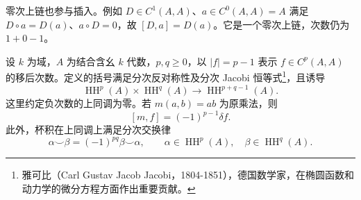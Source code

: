零次上链也参与插入。例如 \(D\in C^1(A,A)\)、\(a\in C^0(A,A)=A\) 满足 \(D\circ a=D(a)\)、\(a\circ D=0\)，故 \([D,a]=D(a)\)。它是一个零次上链，次数仍为 \(1+0-1\)。

\begin{proposition}\label{b4:prop:gerstenhaber-identities}
	设 \(k\) 为域，\(A\) 为结合含幺 \(k\) 代数，\(p,q\ge0\)，以 \(|f|=p-1\) 表示 \(f\in C^p(A,A)\) 的移后次数。定义的括号满足分次反对称性及分次 Jacobi 恒等式\footnote{雅可比（Carl Gustav Jacob Jacobi，1804-1851），德国数学家，在椭圆函数和动力学的微分方程方面作出重要贡献。}，且诱导
	\[
		\operatorname{HH}^p(A)\times\operatorname{HH}^q(A) \longrightarrow\operatorname{HH}^{p+q-1}(A).
	\]
	这里约定负次数的上同调为零。若 \(m(a,b)=ab\) 为原乘法，则
	\[
		[m,f]=(-1)^{p-1}\delta f.
	\]
	此外，杯积在上同调上满足分次交换律
	\[
		\alpha\smile\beta=(-1)^{pq}\beta\smile\alpha, \qquad \alpha\in\operatorname{HH}^p(A),\quad \beta\in\operatorname{HH}^q(A).
	\]
\end{proposition}
